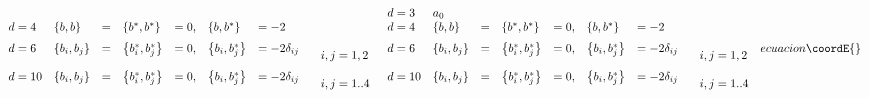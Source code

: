 \documentclass[a4paper,12pt]{book}
\begin{document}
\begin{itemize}
\begin{equation}
{\begin{array}{llllllll}
\\ 
d=4 & \left\{ b,b\right\} & = & \left\{ b^{*},b^{*}\right\} & =0, & \left\{
b,b^{*}\right\} & =-2 & 
\begin{array}{l}
\end{array}
\\ 
d=6 & \left\{ b_{i},b_{j}\right\} & = & \left\{ b_{i}^{*},b_{j}^{*}\right\}
& =0, & \left\{ b_{i},b_{j}^{*}\right\} & =-2\delta _{ij} & 
\begin{array}{l}
\\ 
{\ i,j=1,2}
\end{array}
\\ 
d=10 & \left\{ b_{i},b_{j}\right\} & = & \left\{ b_{i}^{*},b_{j}^{*}\right\}
& =0, & \left\{ b_{i},b_{j}^{*}\right\} & =-2\delta _{ij} & 
\begin{array}{l}
\\ 
{\ i,j=1..4}
\end{array}
\end{array}
}{
\begin{array}{llllllll}
d=3 & a_{0} &  &  &  &  &  & 
\begin{array}{l}
\end{array}
\\ 
d=4 & \left\{ b,b\right\} & = & \left\{ b^{*},b^{*}\right\} & =0, & \left\{
b,b^{*}\right\} & =-2 & 
\begin{array}{l}
\end{array}
\\ 
d=6 & \left\{ b_{i},b_{j}\right\} & = & \left\{ b_{i}^{*},b_{j}^{*}\right\}
& =0, & \left\{ b_{i},b_{j}^{*}\right\} & =-2\delta _{ij} & 
\begin{array}{l}
\\ 
{\ i,j=1,2}
\end{array}
\\ 
d=10 & \left\{ b_{i},b_{j}\right\} & = & \left\{ b_{i}^{*},b_{j}^{*}\right\}
& =0, & \left\{ b_{i},b_{j}^{*}\right\} & =-2\delta _{ij} & 
\begin{array}{l}
\\ 
{\ i,j=1..4}
\end{array}
\end{array}
}{ecuacion}\coordE{}\end{equation}


\end{itemize}
\end{document}
